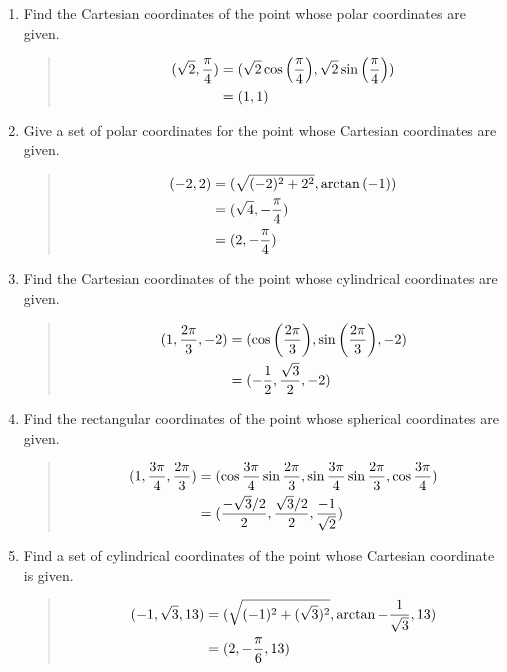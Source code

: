 \documentclass{hw}
\begin{document}

\begin{enumerate}
\item Find the Cartesian coordinates of the point whose polar coordinates are given.
\begin{quote}
\begin{align*}
(\sqrt{2},{\pi\over4}) &= (\sqrt{2}\cos{\left({\pi\over4}\right)},
\sqrt{2}\sin{\left({\pi\over4}\right)})\\
&= (1,1)
\end{align*}
\end{quote}

\item Give a set of polar coordinates for the point whose Cartesian coordinates are given.
\begin{quote}
\begin{align*}
(-2,2) &= (\sqrt{(-2)^{2} + 2^{2}}, \arctan{(-1)})\\
&= (\sqrt{4},-{\pi\over4})\\
&= (2,-{\pi\over4})
\end{align*}
\end{quote}

\item Find the Cartesian coordinates of the point whose cylindrical coordinates are given.
\begin{quote}
\begin{align*}
(1,{2\pi\over3},-2) &=
(\cos{\left({2\pi\over3}\right)},\sin{\left({2\pi\over3}\right)},-2)\\
&= (-{1\over2},{\sqrt{3}\over2},-2)
\end{align*}
\end{quote}

\item Find the rectangular coordinates of the point whose spherical coordinates are given.
\begin{quote}
\begin{align*}
(1,{3\pi\over4},{2\pi\over3}) &=
(\cos{{3\pi\over4}}\sin{{2\pi\over3}},\sin{{3\pi\over4}}\sin{{2\pi\over3}},\cos{{3\pi\over4}})\\
&= ({-\sqrt{3}/2\over2},{\sqrt{3}/2\over2},{-1\over\sqrt{2}})
\end{align*}
\end{quote}

\item Find a set of cylindrical coordinates of the point whose Cartesian coordinate is given.
\begin{quote}
\begin{align*}
(-1,\sqrt{3},13) &= (\sqrt{(-1)^2 + (\sqrt{3})^2},\arctan{-{1\over\sqrt{3}}},13)\\
&= (2,-{\pi\over6},13)
\end{align*}
\end{quote}
\end{enumerate}
\end{document}

